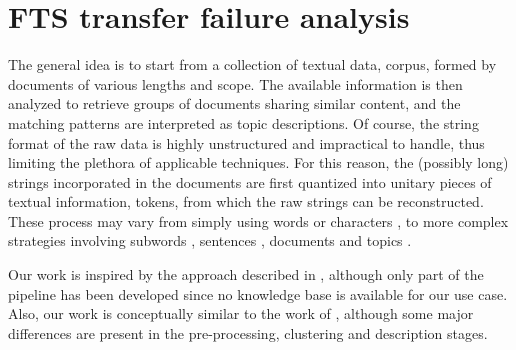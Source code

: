 \chapter{FTS transfer failure analysis} \label{sec:pipeline}

The general idea is to start from a collection of textual data, corpus, formed by documents of various lengths and scope.
The available information is then analyzed to retrieve groups of documents sharing similar content, and the matching patterns are interpreted as topic descriptions.
Of course, the string format of the raw data is highly unstructured and impractical to handle, thus limiting the plethora of applicable techniques. 
For this reason, the (possibly long) strings incorporated in the documents are first quantized into unitary pieces of textual information, tokens, from which the raw strings can be reconstructed. These process may vary from simply using words \cite{bengio2003word, mccann2017word} or characters \cite{ling2015char, dhingra2016char}, to more complex strategies involving subwords \cite{gage1994subword, sennrich2016subword}, sentences \cite{kiros2015sentence}, documents \cite{le2014documents} and topics \cite{niu2015topic}. 



Our work is inspired by the approach described in \cite{lin2016log}, although only part of the pipeline has been developed since no knowledge base is available for our use case.
Also, our work is conceptually similar to the work of \cite{clusterlog2021}, although some major differences are present in the pre-processing, clustering and description stages.

